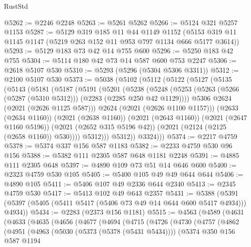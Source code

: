 \begin{lexlean}{RustStd}
\begin{coremodule}
{\begin{coremodule}
{{{{{{{{{{{{{{{{@5262 := @2246 @2248
@5263 := @5261 @5262
@5266 := @5124 @321 @5257 @1153
@5287 := @5129
    @319
    @185
    @11
    @44
    @1149
    @1152
    (@5153 @319 @11 @1145 @1147 (@5219 @263 @152 @11 @953 @797 @1134 @666 @5177 @3614))
@5293 := @5129 @183 @73 @42 @14 @755 @600
@5296 := @5250 @183 @42 @755
@5304 := @5114 @180 @42 @73 @14 @587 @600 @753 @2247
@5306 := @2618 @5107 @530
@5310 := @5293 (@5296 (@5304 @5306 @3311))
@5312 := @2100 @5107 @530
@5373 := @5038
    (@5102
      (@5112
        (@5122
          (@5127
            (@5135
              (@5143
                (@5181
                  (@5187
                    (@5191
                      (@5201
                        (@5238
                          (@5248
                            (@5253
                              (@5263 (@5266 (@5287 (@5310 @5312))) (@2283 (@2285 @250 @42 @1129))))
                            @5306
                            @2624
                            (@2021 (@2626 @1125 @587)))
                          @2624
                          (@2021 (@2626 @1100 @1157)))
                        (@2633 (@2634 @1160))
                        (@2021 (@2638 @1160))
                        (@2021 (@2643 @1160))
                        (@2021 (@2647 @1160 @5196))
                        (@2021 (@2652 @315 @5196 @42))
                        (@2021 (@2124 (@2125 (@2658 @1160)) @530))))
                    @5312)))
              @5312))
          @3324)))
@5374 := @2217 @4759
@5378 := @5374 @337 @156 @587 @1183
@5382 := @2233 @4759 @530 @96 @156
@5388 := @5382 @111 @2305 @587 @648 @1181 @2248
@5391 := @4885 @111 @2305 @648
@5397 := @4890 @109 @73 @51 @14 @646 @600
@5400 := @2323 @4759 @530 @105
@5405 := @5400 @105 @49 @49 @644 @644
@5406 := @4890 @105
@5411 := @5406 @107 @49 @2336 @644 @2340
@5413 := @2345 @4759 @530
@5417 := @5413 @102 @49 @643 @2357
@5431 := @5388 (@5391 (@5397 (@5405 (@5411 @5417 (@5406 @73 @49 @14 @644 @600 @5417 @4934))) @4934))
@5434 := @2283 (@2373 @156 @1181)
@5515 := @4563
    (@4589
      (@4631
        (@4633
          (@4635
            (@4656
              (@4677
                (@4694
                  (@4715
                    (@4726
                      (@4730
                        (@4757
                          (@4862
                            (@4951
                              (@4963
                                (@5030 (@5373 (@5378 (@5431 @5434))))
                                (@5374
                                  @350
                                  @156
                                  @587
                                  @1194
}}}}}}}}}}}}}}}}
\end{coremodule}}
\end{coremodule}
\end{lexlean}
